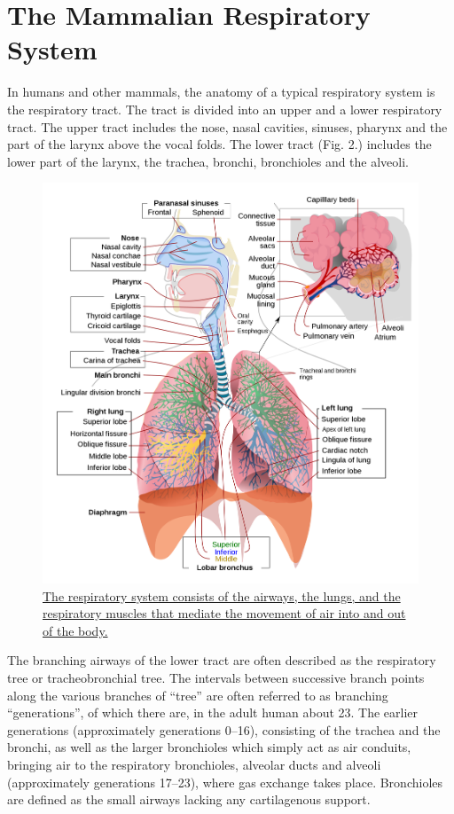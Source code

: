 \hypertarget{the-mammalian-respiratory-system}{%
\section{The Mammalian Respiratory System}\label{the-mammalian-respiratory-system}}

In humans and other mammals, the anatomy of a typical respiratory system is the respiratory tract. The tract is divided into an upper and a lower respiratory tract. The upper tract includes the nose, nasal cavities, sinuses, pharynx and the part of the larynx above the vocal folds. The lower tract (Fig. 2.) includes the lower part of the larynx, the trachea, bronchi, bronchioles and the alveoli.



\begin{figure}

{\centering \includegraphics[width=0.7\linewidth]{./figures/respiratory/Respiratory_system_complete_en} 

}

\caption{\href{https://commons.wikimedia.org/wiki/File:Respiratory_system_complete_en.svg}{The respiratory system consists of the airways, the lungs, and the respiratory muscles that mediate the movement of air into and out of the body.}}\label{fig:respiratorysystem}
\end{figure}

The branching airways of the lower tract are often described as the respiratory tree or tracheobronchial tree. The intervals between successive branch points along the various branches of ``tree'' are often referred to as branching ``generations'', of which there are, in the adult human about 23. The earlier generations (approximately generations 0--16), consisting of the trachea and the bronchi, as well as the larger bronchioles which simply act as air conduits, bringing air to the respiratory bronchioles, alveolar ducts and alveoli (approximately generations 17--23), where gas exchange takes place. Bronchioles are defined as the small airways lacking any cartilagenous support.

